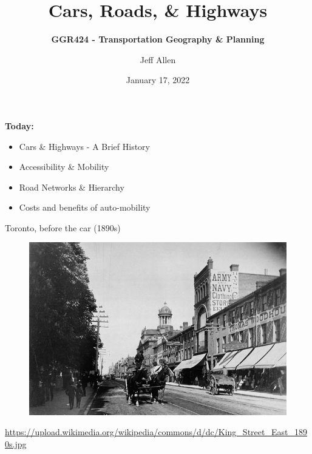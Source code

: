 \documentclass[aspectratio=169]{beamer}
\title{\textbf{Cars, Roads, \& Highways}}
\subtitle{\textbf{GGR424 - Transportation Geography \& Planning}}
\author{Jeff Allen}
\institute{University of Toronto}
\date{January 17, 2022}
\begin{document}
	
\begin{frame}
	\titlepage	
\end{frame}



\begin{frame}
\textbf{Today:}
\begin{itemize}
	\item Cars \& Highways - A Brief History
	\item Accessibility \& Mobility
	\item Road Networks \& Hierarchy
	\item Costs and benefits of auto-mobility
\end{itemize}
\end{frame}






\begin{frame}
	
	Toronto, before the car (1890s)
	
	\begin{figure}
		\centering
		\includegraphics[width=0.8\linewidth]{images/king_east_1890s.jpg}
		
	\end{figure}
	
	\tiny{\url{https://upload.wikimedia.org/wikipedia/commons/d/dc/King_Street_East_1890s.jpg}}
\end{frame}
\end{document}
